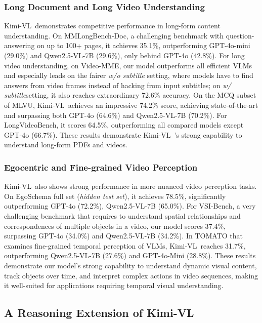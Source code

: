 \documentclass{article}
\newcommand{\ourname}{{Kimi-VL}}
\begin{document}
\subsubsection{Long Document and Long Video Understanding}







\ourname~demonstrates competitive performance in long-form content understanding. On MMLongBench-Doc, a challenging benchmark with question-answering on up to 100+ pages, it achieves 35.1\%, outperforming GPT-4o-mini (29.0\%) and Qwen2.5-VL-7B (29.6\%), only behind GPT-4o (42.8\%). For long video understanding, on Video-MME, our model outperforms all efficient VLMs and especially leads on the fairer \textit{w/o subtitle} setting, where models have to find answers from video frames instead of hacking from input subtitles; on \textit{w/ subtitle}setting, it also reaches extraordinary 72.6\% accuracy. On the MCQ subset of MLVU, \ourname~achieves an impressive 74.2\% score, achieving state-of-the-art and surpassing both GPT-4o (64.6\%) and Qwen2.5-VL-7B (70.2\%). For LongVideoBench, it scores 64.5\%, outperforming all compared models except GPT-4o (66.7\%). These results demonstrate \ourname~'s strong capability to understand long-form PDFs and videos.

\subsubsection{Egocentric and Fine-grained Video Perception}

\ourname~also shows strong performance in more nuanced video perception tasks. On EgoSchema full set (\textit{hidden test set}), it achieves 78.5\%, significantly outperforming GPT-4o (72.2\%), Qwen2.5-VL-7B (65.0\%). For VSI-Bench, a very challenging benchmark that requires to understand spatial relationships and correspondences of multiple objects in a video, our model scores 37.4\%, surpassing GPT-4o (34.0\%) and Qwen2.5-VL-7B (34.2\%). In TOMATO that examines fine-grained temporal perception of VLMs, \ourname~reaches 31.7\%, outperforming Qwen2.5-VL-7B (27.6\%) and GPT-4o-Mini (28.8\%). These results demonstrate our model's strong capability to understand dynamic visual content, track objects over time, and interpret complex actions in video sequences, making it well-suited for applications requiring temporal visual understanding.



\subsection{A Reasoning Extension of \ourname}
\end{document}
